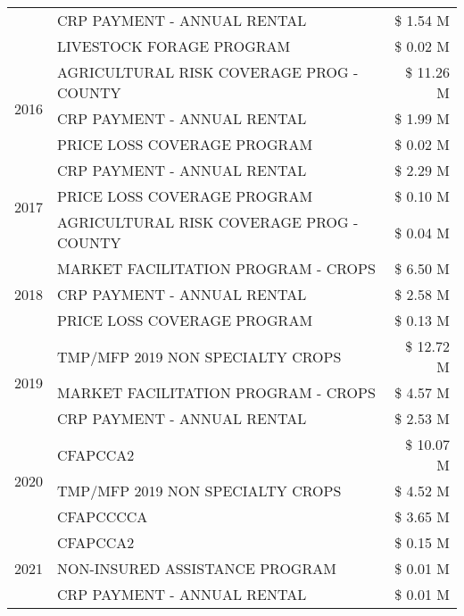 \begin{tabular}{llr}
 & CRP PAYMENT - ANNUAL RENTAL & \$ 1.54 M \\
 & LIVESTOCK FORAGE PROGRAM & \$ 0.02 M \\
\cline{1-3}
\multirow[t]{3}{*}{2016} & AGRICULTURAL RISK COVERAGE PROG - COUNTY & \$ 11.26 M \\
 & CRP PAYMENT - ANNUAL RENTAL & \$ 1.99 M \\
 & PRICE LOSS COVERAGE PROGRAM & \$ 0.02 M \\
\cline{1-3}
\multirow[t]{3}{*}{2017} & CRP PAYMENT - ANNUAL RENTAL & \$ 2.29 M \\
 & PRICE LOSS COVERAGE PROGRAM & \$ 0.10 M \\
 & AGRICULTURAL RISK COVERAGE PROG - COUNTY & \$ 0.04 M \\
\cline{1-3}
\multirow[t]{3}{*}{2018} & MARKET FACILITATION PROGRAM - CROPS & \$ 6.50 M \\
 & CRP PAYMENT - ANNUAL RENTAL & \$ 2.58 M \\
 & PRICE LOSS COVERAGE PROGRAM & \$ 0.13 M \\
\cline{1-3}
\multirow[t]{3}{*}{2019} & TMP/MFP 2019 NON SPECIALTY CROPS & \$ 12.72 M \\
 & MARKET FACILITATION PROGRAM - CROPS & \$ 4.57 M \\
 & CRP PAYMENT - ANNUAL RENTAL & \$ 2.53 M \\
\cline{1-3}
\multirow[t]{3}{*}{2020} & CFAPCCA2 & \$ 10.07 M \\
 & TMP/MFP 2019 NON SPECIALTY CROPS & \$ 4.52 M \\
 & CFAPCCCCA & \$ 3.65 M \\
\cline{1-3}
\multirow[t]{3}{*}{2021} & CFAPCCA2 & \$ 0.15 M \\
 & NON-INSURED ASSISTANCE PROGRAM & \$ 0.01 M \\
 & CRP PAYMENT - ANNUAL RENTAL & \$ 0.01 M \\
\cline{1-3}
\bottomrule
\end{tabular}
